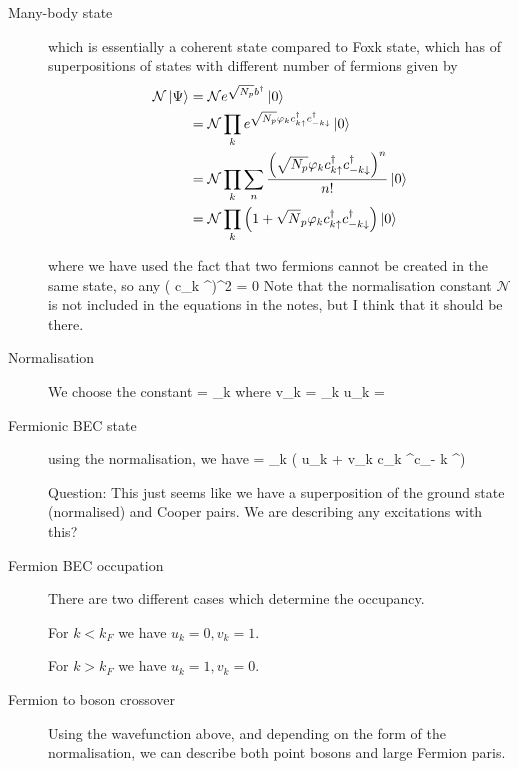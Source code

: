 \begin{description}
\item[Many-body state] which is essentially a coherent state compared to Foxk state, which has of superpositions of states with different number of fermions given by 
\begin{align}
\mathcal{N} \left| \Psi \right\rangle &= \mathcal{N} e^{\sqrt{N_p}b^\dagger} \left| 0 \right\rangle \\
&= \mathcal{N} \prod_k e^{\sqrt{N_p} \varphi_k c_{k \uparrow}^\dagger c^\dagger_{- k \downarrow}} \left| 0 \right\rangle \\
&= \mathcal{N} \prod_k \sum_n  \frac{\left( \sqrt{N_p} \varphi_k c_{k \uparrow}^\dagger c^\dagger_{- k \downarrow} \right)^n}{n!} \left| 0 \right\rangle \\
&= \mathcal{N} \prod_k \left( 1 + \sqrt{N}_p \varphi_k c_{k \uparrow }^\dagger c^\dagger_{- k \downarrow}   \right)\left| 0 \right\rangle
\end{align}


where we have used the fact that two fermions cannot be created in the same state, so any
\beq
\left( c_{k \uparrow}^\dagger \right)^2  = 0
\eeq
Note that the normalisation constant  $\mathcal{N} $ is not included in the equations in the notes, but I think that it should be there. 



\item[Normalisation] We choose the constant
\beq
{}  = \prod_k 
\eeq
where
\beq
v_k =  \varphi_k u_k = 
\eeq

\item[Fermionic BEC state] using the normalisation, we have
\beq
{} = \prod_k \left( u_k + v_k c_{k \uparrow}^\dagger c_{- k \downarrow} ^\dagger \right) 
\eeq

Question: This just seems like we have a superposition of the ground state (normalised) and Cooper pairs. We are describing any excitations with this? 



\item[Fermion BEC occupation] There are two different cases which determine the occupancy. 

For $k < k_F$ we have $u_k = 0, v_k = 1$. 

For $k >k_F$ we have $u_k = 1, v_k = 0$. 



\item[Fermion to boson crossover] Using the wavefunction above, and depending on the form of the normalisation, we can describe both point bosons and large Fermion paris.


\end{description}

